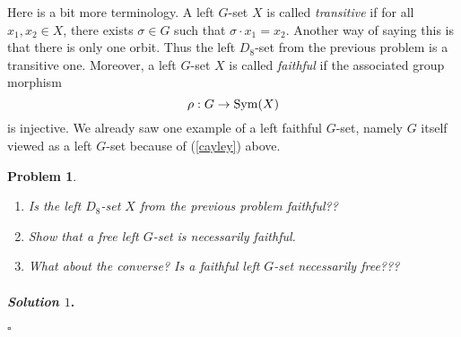 \documentclass[reqno]{amsart}
\theoremstyle{plain}
\newtheorem{problem}{Problem}
\theoremstyle{definition}
\newenvironment{solution1}{\paragraph{\emph{Solution $1$}.}}{\hfill$\square$}
\begin{document}
Here is a bit more terminology.  A left $G$-set $X$ is called \emph{transitive} if for all $x_{1}, x_{2} \in X$, there exists $\sigma \in G$ such that $\sigma \cdot x_{1} = x_{2}$.  Another way of saying this is that there is only one orbit.  Thus the left $D_{8}$-set from the previous problem is a transitive one.  Moreover, a left $G$-set $X$ is called \emph{faithful} if the associated group morphism
$$\rho:G \rightarrow {\rm Sym}(X) $$
is injective.  We already saw one example of a left faithful $G$-set, namely $G$ itself viewed as a left $G$-set because of (\ref{cayley}) above.
\begin{problem}
\hspace{1cm}
\begin{enumerate}[label=(\alph*)]
\item Is the left $D_{8}$-set $X$ from the previous problem faithful??
\item Show that a free left $G$-set is necessarily faithful.
\item What about the converse?  Is a faithful left $G$-set necessarily free???
\end{enumerate}
\end{problem}
\begin{solution1}

\end{solution1}
\end{document}
